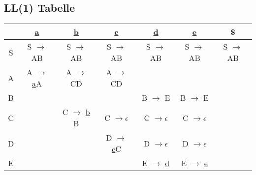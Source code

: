 \documentclass[12pt,runningheads,a4paper]{llncs}
\begin{document}
\newpage
\subsection*{LL(1) Tabelle}

\begin{table}[htbp]
    \centering
      \begin{tabular}{|c|c|c|c|c|c|c|}
\hline
   & \underline{a} & \underline{b} & \underline{c} & \underline{d} & \underline{e} & \$ \\ \hline
S & S $\rightarrow$ AB & S $\rightarrow$ AB & S $\rightarrow$ AB&  S $\rightarrow$ AB  &  S $\rightarrow$ AB &  S $\rightarrow$ AB \\ \hline
A & A $\rightarrow$ \underline{a}A & A $\rightarrow$ CD & A $\rightarrow$ CD &   &  &  \\ \hline
B &  &   &   & B $\rightarrow$ E &B $\rightarrow$ E  &   \\ \hline
C  &  & C $\rightarrow$ \underline{b} B & C $\rightarrow \epsilon$ &C $\rightarrow \epsilon$   & C $\rightarrow \epsilon$ & \\ \hline
D &  &   &D $\rightarrow$ \underline{c}C   &D $\rightarrow \epsilon$   &D $\rightarrow \epsilon$  &   \\ \hline
E &  &   & &E $\rightarrow$ \underline{d}   &E $\rightarrow$ \underline{e}  &   \\
\hline
        \end{tabular}
\end{table}
\end{document}
